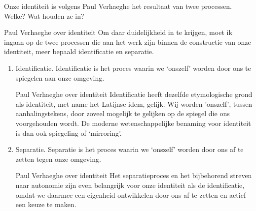 \documentclass[main.tex]{subfiles}
\begin{document}
\begin{examenvraag}
    \begin{vraag}
        Onze identiteit is volgens Paul Verhaeghe het resultaat van twee processen. Welke? Wat houden ze in?
    \end{vraag}

    \begin{antwoord}
        \begin{citaat}{Paul Verhaeghe over identiteit}
            Om daar duidelijkheid in te krijgen, moet ik ingaan op de twee processen die aan het werk zijn binnen de constructie van onze identiteit, meer bepaald identificatie en separatie.
        \end{citaat}
        \begin{enumerate}
            \item Identificatie.
                Identificatie is het proces waarin we `onszelf' worden door ons te spiegelen aan onze omgeving.
                \begin{citaat}{Paul Verhaeghe over identiteit}
                    Identificatie heeft dezelfde etymologische grond als identiteit, met name het Latijnse idem, gelijk.
                    Wij worden 'onszelf', tussen aanhalingstekens, door zoveel mogelijk te gelijken op de spiegel die ons voorgehouden wordt.
                    De moderne wetenschappelijke benaming voor identiteit is dan ook spiegeling of `mirroring'.
                \end{citaat}
            \item Separatie.
                Separatie is het proces waarin we `onszelf' worden door ons af te zetten tegen onze omgeving.
                \begin{citaat}{Paul Verhaeghe over identiteit}
                Het separatieproces en het bijbehorend streven naar autonomie zijn even belangrijk voor onze identiteit als de identificatie, omdat we daarmee een eigenheid ontwikkelen door ons af te zetten en actief een keuze te maken.
                \end{citaat}
        \end{enumerate}
    \end{antwoord}
\end{examenvraag}
\end{document}

